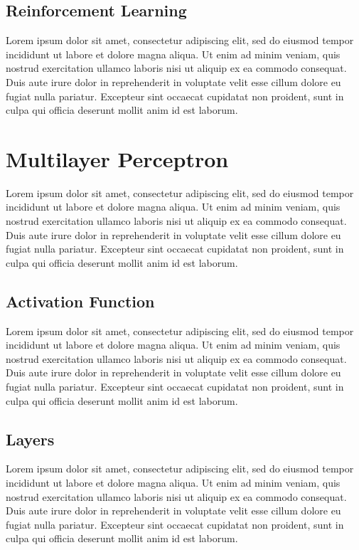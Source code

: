 \subsection{Reinforcement Learning}
Lorem ipsum dolor sit amet, consectetur adipiscing elit, sed do eiusmod tempor incididunt ut labore et dolore magna aliqua. Ut enim ad minim veniam, quis nostrud exercitation ullamco laboris nisi ut aliquip ex ea commodo consequat. Duis aute irure dolor in reprehenderit in voluptate velit esse cillum dolore eu fugiat nulla pariatur. Excepteur sint occaecat cupidatat non proident, sunt in culpa qui officia deserunt mollit anim id est laborum. \\

\section{Multilayer Perceptron}
Lorem ipsum dolor sit amet, consectetur adipiscing elit, sed do eiusmod tempor incididunt ut labore et dolore magna aliqua. Ut enim ad minim veniam, quis nostrud exercitation ullamco laboris nisi ut aliquip ex ea commodo consequat. Duis aute irure dolor in reprehenderit in voluptate velit esse cillum dolore eu fugiat nulla pariatur. Excepteur sint occaecat cupidatat non proident, sunt in culpa qui officia deserunt mollit anim id est laborum. \\

\subsection{Activation Function}
Lorem ipsum dolor sit amet, consectetur adipiscing elit, sed do eiusmod tempor incididunt ut labore et dolore magna aliqua. Ut enim ad minim veniam, quis nostrud exercitation ullamco laboris nisi ut aliquip ex ea commodo consequat. Duis aute irure dolor in reprehenderit in voluptate velit esse cillum dolore eu fugiat nulla pariatur. Excepteur sint occaecat cupidatat non proident, sunt in culpa qui officia deserunt mollit anim id est laborum. \\

\subsection{Layers}
Lorem ipsum dolor sit amet, consectetur adipiscing elit, sed do eiusmod tempor incididunt ut labore et dolore magna aliqua. Ut enim ad minim veniam, quis nostrud exercitation ullamco laboris nisi ut aliquip ex ea commodo consequat. Duis aute irure dolor in reprehenderit in voluptate velit esse cillum dolore eu fugiat nulla pariatur. Excepteur sint occaecat cupidatat non proident, sunt in culpa qui officia deserunt mollit anim id est laborum. \\

